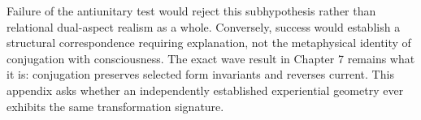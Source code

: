 Failure of the antiunitary test would reject this subhypothesis rather than relational dual-aspect realism as a whole. Conversely, success would establish a structural correspondence requiring explanation, not the metaphysical identity of conjugation with consciousness. The exact wave result in Chapter 7 remains what it is: conjugation preserves selected form invariants and reverses current. This appendix asks whether an independently established experiential geometry ever exhibits the same transformation signature.
